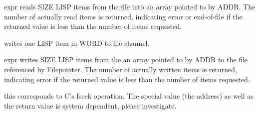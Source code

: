 {expr}
{reads SIZE LISP items from the file into an array pointed to by ADDR.
The number of actually read items is returned,
indicating error or end-of-file if the returned
value is less than the number of items requested.}

{writes one LISP item in WORD to file channel.}

{expr}
{writes SIZE LISP items from the an array pointed to by ADDR to the file
referenced by Filepointer.
The number of actually written items is returned,
indicating error if the returned value is less than the number of
items requested.}

{this corresponds to C's fseek operation. The special value (the address)
as well as the
return value is system dependent, please investigate.}
